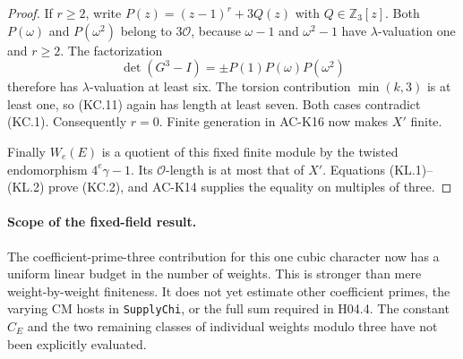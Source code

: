 \begin{proof}
If $r\geq2$, write $P(z)=(z-1)^r+3Q(z)$ with
$Q\in\mathbb Z_3[z]$.  Both $P(\omega)$ and
$P(\omega^2)$ belong to $3\mathcal O$, because
$\omega-1$ and $\omega^2-1$ have $\lambda$-valuation one
and $r\geq2$.  The factorization
\[
 \det(G^3-I)=\pm P(1)P(\omega)P(\omega^2)
\]
therefore has $\lambda$-valuation at least six.
The torsion contribution $\min(k,3)$ is at least one,
so (KC.11) again has length at least seven.
Both cases contradict (KC.1).  Consequently $r=0$.
Finite generation in AC-K16 now makes $X'$ finite.

Finally $W_e(E)$ is a quotient of this fixed finite module
by the twisted endomorphism $4^e\gamma-1$.
Its $\mathcal O$-length is at most that of $X'$.
Equations (KL.1)--(KL.2) prove (KC.2), and AC-K14 supplies
the equality on multiples of three.
\end{proof}

\paragraph{Scope of the fixed-field result.}
The coefficient-prime-three contribution for this one cubic
character now has a uniform linear budget in the number of
weights.  This is stronger than mere weight-by-weight
finiteness.  It does not yet estimate other coefficient
primes, the varying CM hosts in \texttt{SupplyChi}, or the
full sum required in H04.4.  The constant $C_E$ and the two
remaining classes of individual weights modulo three have
not been explicitly evaluated.
